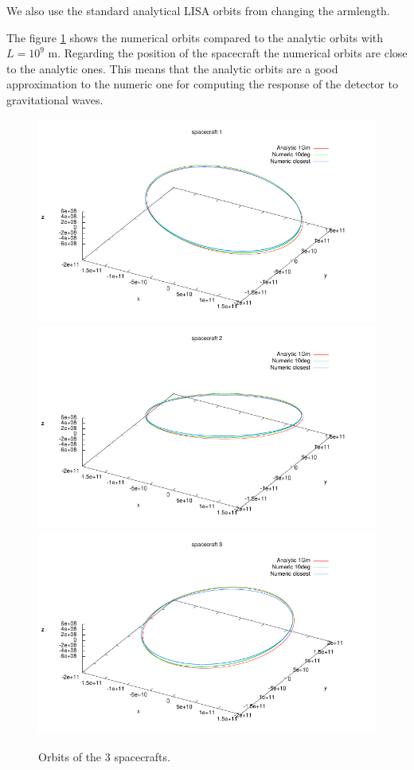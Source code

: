 \documentclass{iopart}
\begin{document}
We also use the standard analytical LISA orbits from \cite{dhu05} changing the armlength.

The figure \ref{F:OrbSC} shows the numerical orbits compared to the analytic orbits with $L = 10^9$ m.
Regarding the position of the spacecraft the numerical orbits are close to the analytic ones. This means that the analytic orbits are a good approximation to the numeric one for computing the response of the detector to gravitational waves.

\begin{figure}
\begin{center}
\includegraphics[scale=0.5,clip]{FigNoiseOrbSens/Orb_SC1_LISA-CLISA-10LISA.pdf}
\includegraphics[scale=0.5,clip]{FigNoiseOrbSens/Orb_SC2_LISA-CLISA-10LISA.pdf}
\includegraphics[scale=0.5,clip]{FigNoiseOrbSens/Orb_SC3_LISA-CLISA-10LISA.pdf} 
\end{center}
\caption{Orbits of the 3 spacecrafts.
\label{F:OrbSC} } 
\end{figure}
\end{document}
